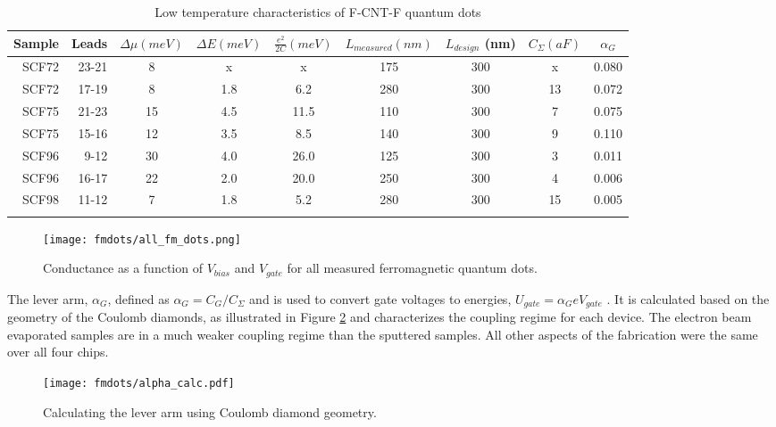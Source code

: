 \begin{table}
    \centering
    \footnotesize
    \begin{tabular}{ r | r | c c c c c c c}
        Sample & Leads & $\Delta \mu (meV)$ & $\Delta E (meV)$ & $\frac{e^2}{2C} (meV)$ & $L_{measured} (nm)$ & $L_{design}$ (nm) & $C_{\Sigma} (aF)$ & $\alpha_{G}$ \\ \hline
        SCF72 & 23-21 & 8  & x   & x    & 175 & 300 & x  & 0.080 \\ 
        SCF72 & 17-19 & 8  & 1.8 & 6.2  & 280 & 300 & 13 & 0.072 \\
        SCF75 & 21-23 & 15 & 4.5 & 11.5 & 110 & 300 & 7  & 0.075 \\
        SCF75 & 15-16 & 12 & 3.5 & 8.5  & 140 & 300 & 9  & 0.110 \\
        SCF96 & 9-12  & 30 & 4.0 & 26.0 & 125 & 300 & 3  & 0.011 \\
        SCF96 & 16-17 & 22 & 2.0 & 20.0 & 250 & 300 & 4  & 0.006 \\
        SCF98 & 11-12 & 7  & 1.8 & 5.2  & 280 & 300 & 15 & 0.005 \\
        \label{table:cold_fm_devices}  
    \end{tabular}
    \caption{Low temperature characteristics of F-CNT-F quantum dots}
\end{table}

\begin{figure}
    \centering
    \texttt{[image: fmdots/all\_fm\_dots.png]}
    \caption{Conductance as a function of $V_{bias}$ and $V_{gate}$ for all measured ferromagnetic quantum dots.}
    \label{fig:all_FM_QD}
\end{figure}

The lever arm, $\alpha_{G}$, defined as $\alpha_{G} = C_G/C_{\Sigma}$ and is used to convert gate voltages to energies, $U_{gate} = \alpha_{G}eV_{gate}$ \cite{Ihn2004}. It is calculated based on the geometry of the Coulomb diamonds, as illustrated in Figure \ref{fig:alpha_calc} and characterizes the coupling regime for each device. The electron beam evaporated samples are in a much weaker coupling regime than the sputtered samples. All other aspects of the fabrication were the same over all four chips. 

\begin{figure}
    \centering
    \texttt{[image: fmdots/alpha\_calc.pdf]}
    \caption{Calculating the lever arm using Coulomb diamond geometry.}
    \label{fig:alpha_calc}
\end{figure}

